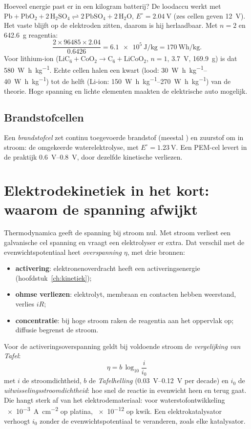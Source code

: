 \begin{voorbeeld}{Hoeveel energie past er in een kilogram batterij?}
De loodaccu werkt met $\mathrm{Pb + PbO_2 + 2\,H_2SO_4 \rightleftharpoons 2\,PbSO_4 + 2\,H_2O}$, $E^\circ = \SI{2.04}{\volt}$ (zes cellen geven \SI{12}{\volt}). Het vaste  blijft op de elektroden zitten, daarom is hij herlaadbaar. Met $n = 2$ en \SI{642.6}{\gram} reagentia:
\[
\frac{2 \times 96485 \times 2.04}{0.6426} = \SI{6.1e5}{\joule\per\kilogram} = \SI{170}{\watt\hour\per\kilogram}.
\]
Voor lithium-ion ($\mathrm{LiC_6 + CoO_2 \rightarrow C_6 + LiCoO_2}$, $n = 1$, \SI{3.7}{\volt}, \SI{169.9}{\gram}) is dat \SI{580}{\watt\hour\per\kilogram}. Echte cellen halen een kwart (lood: \SIrange{30}{40}{\watt\hour\per\kilogram}) tot de helft (Li-ion: \SIrange{150}{270}{\watt\hour\per\kilogram}) van de theorie. Hoge spanning en lichte elementen maakten de elektrische auto mogelijk.
\end{voorbeeld}

\subsection{Brandstofcellen}

Een \emph{brandstofcel} zet continu toegevoerde brandstof (meestal ) en zuurstof om in stroom: de omgekeerde waterelektrolyse, met $E^\circ = \SI{1.23}{\volt}$. Een PEM-cel levert in de praktijk \SIrange{0.6}{0.8}{\volt}, door dezelfde kinetische verliezen.

\section{Elektrodekinetiek in het kort: waarom de spanning afwijkt}
\label{sec:elektrodekinetiek}

Thermodynamica geeft de spanning bij stroom nul. Met stroom verliest een galvanische cel spanning en vraagt een elektrolyser er extra. Dat verschil met de evenwichtspotentiaal heet \emph{overspanning} $\eta$, met drie bronnen:
\begin{itemize}
\item \textbf{activering}: elektronenoverdracht heeft een activeringsenergie (hoofdstuk~\ref{ch:kinetiek});
\item \textbf{ohmse verliezen}: elektrolyt, membraan en contacten hebben weerstand, verlies $iR$;
\item \textbf{concentratie}: bij hoge stroom raken de reagentia aan het oppervlak op; diffusie begrenst de stroom.
\end{itemize}
Voor de activeringsoverspanning geldt bij voldoende stroom de \emph{vergelijking van Tafel}:
\begin{equation}
\boxed{\;\eta = b\,\log_{10}\frac{i}{i_0}\;}
\label{eq:tafel}
\end{equation}
met $i$ de stroomdichtheid, $b$ de \emph{Tafelhelling} (\SIrange{0.03}{0.12}{\volt} per decade) en $i_0$ de \emph{uitwisselingsstroomdichtheid}: hoe snel de reactie in evenwicht heen en terug gaat. Die hangt sterk af van het elektrodemateriaal: voor waterstofontwikkeling \SI{e-3}{\ampere\per\centi\metre\squared} op platina, \SI{e-12}{} op kwik. Een elektrokatalysator verhoogt $i_0$ zonder de evenwichtspotentiaal te veranderen, zoals elke katalysator.

